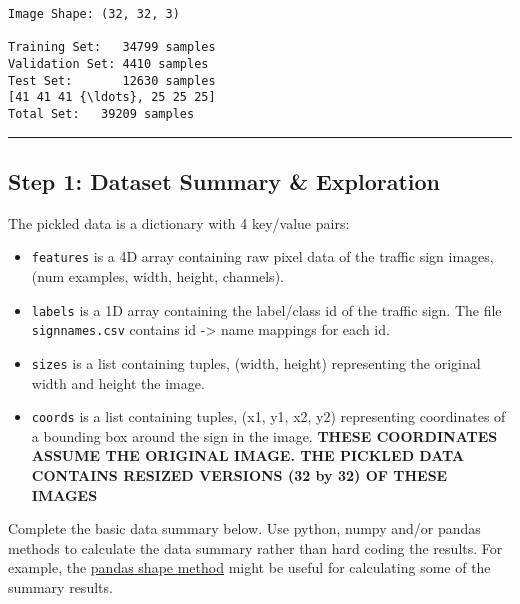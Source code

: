\documentclass[11pt]{article}
\providecommand{\tightlist}{%
      \setlength{\itemsep}{0pt}\setlength{\parskip}{0pt}}
\begin{document}
    \begin{Verbatim}[commandchars=\\\{\}]
Image Shape: (32, 32, 3)

Training Set:   34799 samples
Validation Set: 4410 samples
Test Set:       12630 samples
[41 41 41 {\ldots}, 25 25 25]
Total Set:   39209 samples

    \end{Verbatim}

    \begin{center}\rule{0.5\linewidth}{\linethickness}\end{center}

\hypertarget{step-1-dataset-summary-exploration}{%
\subsection{Step 1: Dataset Summary \&
Exploration}\label{step-1-dataset-summary-exploration}}

The pickled data is a dictionary with 4 key/value pairs:

\begin{itemize}
\tightlist
\item
  \texttt{\textquotesingle{}features\textquotesingle{}} is a 4D array
  containing raw pixel data of the traffic sign images, (num examples,
  width, height, channels).
\item
  \texttt{\textquotesingle{}labels\textquotesingle{}} is a 1D array
  containing the label/class id of the traffic sign. The file
  \texttt{signnames.csv} contains id -\textgreater{} name mappings for
  each id.
\item
  \texttt{\textquotesingle{}sizes\textquotesingle{}} is a list
  containing tuples, (width, height) representing the original width and
  height the image.
\item
  \texttt{\textquotesingle{}coords\textquotesingle{}} is a list
  containing tuples, (x1, y1, x2, y2) representing coordinates of a
  bounding box around the sign in the image. \textbf{THESE COORDINATES
  ASSUME THE ORIGINAL IMAGE. THE PICKLED DATA CONTAINS RESIZED VERSIONS
  (32 by 32) OF THESE IMAGES}
\end{itemize}

Complete the basic data summary below. Use python, numpy and/or pandas
methods to calculate the data summary rather than hard coding the
results. For example, the
\href{http://pandas.pydata.org/pandas-docs/stable/generated/pandas.DataFrame.shape.html}{pandas
shape method} might be useful for calculating some of the summary
results.
\end{document}

